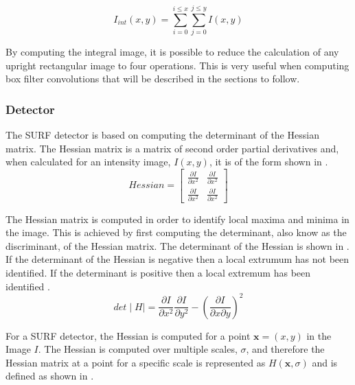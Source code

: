 \documentclass{article}
\begin{document}
\begin{equation}
I_{int}(x,y) = \sum_{i=0}^{i \leq x}\sum_{j=0}^{j \leq y}I(x,y)
\label{eqn:integralImage}
\end{equation}

By computing the integral image, it is possible to reduce the calculation of any upright rectangular image to four operations. This is very useful when computing box filter convolutions that will be described in the sections to follow.\\

\subsubsection{Detector}
\label{2dsurfdetect}
The SURF detector is based on computing the determinant of the Hessian matrix. The Hessian matrix is a matrix of second order partial derivatives and, when calculated for an intensity image,  $I(x,y)$, it is of the form shown in .\\

\begin{equation}
Hessian = \left[ \begin{array}{cc} \frac{\partial I}{\partial x^2} & \frac{\partial I}{\partial x^2}\\
					    \frac{\partial I}{\partial x^2} & \frac{\partial I}{\partial x^2}\end{array} \right]
\label{eqn:hessian}
\end{equation}

The Hessian matrix is computed in order to identify local maxima and minima in the image. This is achieved by first computing the determinant, also know as the discriminant, of the Hessian matrix. The determinant of the Hessian is shown in . If the determinant of the Hessian is negative then a local extrumum has not been identified. If the determinant is positive then a local extremum has been identified \cite{Evans2009}. \\

\begin{equation}
det\mid H \mid = \frac{\partial I}{\partial x^2} \frac{\partial I}{\partial y^2} - (\frac{\partial I}{\partial x \partial y})^2
\label{eqn:determinant}
\end{equation}

For a SURF detector, the Hessian is computed for a point $\textbf{x} = (x,y)$ in the Image $I$. The Hessian is computed over multiple scales, $\sigma$, and therefore the Hessian matrix at a point for a specific scale is represented as $H(\textbf{x}, \sigma)$ \cite{Lowe2004} and is defined as shown in .\\
\end{document}
